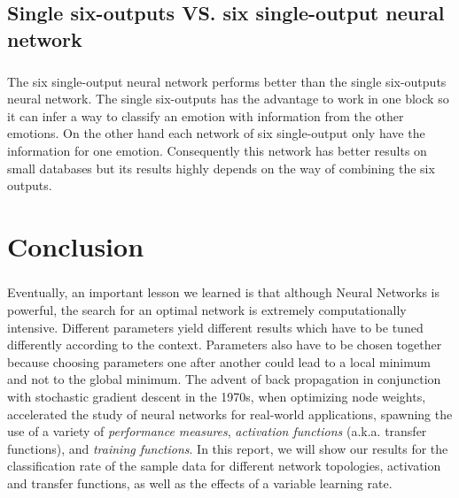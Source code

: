 \documentclass[a4paper,12pt,oneside,final]{report}
\begin{document}
\section{Single six-outputs VS. six single-output neural network}
\paragraph{}
The six single-output neural network performs better than the single six-outputs neural network. The single six-outputs has the advantage to work in one block so it can infer a way to classify an emotion with information from the other emotions. On the other hand each network of six single-output only have the information for one emotion. Consequently this network has better results on small databases but its results highly depends on the way of combining the six outputs.
\chapter{Conclusion}
\paragraph{}
Eventually, an important lesson we learned is that although Neural Networks is powerful, the search for an optimal network is extremely computationally intensive.  Different parameters yield different results which have to be tuned differently according to the context. Parameters also have to be chosen together because choosing parameters one after another could lead to a local minimum and not to the global minimum. The advent of back propagation in conjunction with stochastic gradient descent in the 1970s, when optimizing node weights, accelerated the study of neural networks for real-world applications, spawning the use of a variety of \emph{performance measures}, \emph{activation functions} (a.k.a. transfer functions), and \emph{training functions}.  In this report, we will show our results for the classification rate of the sample data for different network topologies, activation and transfer functions, as well as the effects of a variable learning rate. 




\begin{appendices}

\end{appendices}
\end{document}
